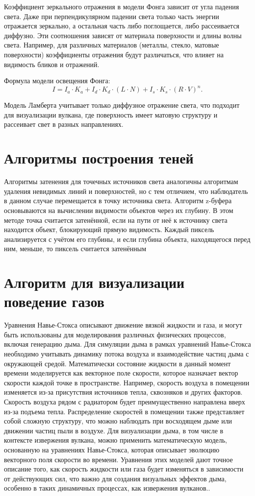 Коэффициент зеркального отражения в модели Фонга зависит от угла падения света. Даже при перпендикулярном падении света только часть энергии отражается зеркально, а остальная часть либо поглощается, либо рассеивается диффузно. Эти соотношения зависят от материала поверхности и длины волны света. Например, для различных материалов (металлы, стекло, матовые поверхности) коэффициенты отражения будут различаться, что влияет на видимость бликов и отражений.

Формула модели освещения Фонга:
$$
I = I_a \cdot K_a + I_d \cdot K_d \cdot (L \cdot N) + I_s \cdot K_s \cdot (R \cdot V)^n.
$$

Модель Ламберта учитывает только диффузное отражение света, что подходит для визуализации вулкана, где поверхность имеет матовую структуру и рассеивает свет в разных направлениях.

\section{Алгоритмы построения теней}
Алгоритмы затенения для точечных источников света аналогичны алгоритмам удаления невидимых линий и поверхностей, но с тем отличием, что наблюдатель в данном случае перемещается в точку источника света. Алгоритм z-буфера основываются на вычислении видимости объектов через их глубину. В этом методе точка считается затенённой, если на пути от неё к источнику света находится объект, блокирующий прямую видимость. Каждый пиксель анализируется с учётом его глубины, и если глубина объекта, находящегося перед ним, меньше, то пиксель считается затенённым

\section{Алгоритм для визуализации поведение газов}
Уравнения Навье-Стокса описывают движение вязкой жидкости и газа, и могут быть использованы для моделирования различных физических процессов, включая генерацию дыма. Для симуляции дыма в рамках уравнений Навье-Стокса необходимо учитывать динамику потока воздуха и взаимодействие частиц дыма с окружающей средой.
Математически состояние жидкости в данный момент времени моделируется как векторное поле скорости, которое назначает вектор скорости каждой точке в пространстве. Например, скорость воздуха в помещении изменяется из-за присутствия источников тепла, сквозняков и других факторов. Скорость воздуха рядом с радиатором будет преимущественно направлена вверх из-за подъема тепла. Распределение скоростей в помещении также представляет собой сложную структуру, что можно наблюдать при восходящем дыме или движении частиц пыли в воздухе. Для визуализации дыма, в том числе в контексте извержения вулкана, можно применить математическую модель, основанную на уравнениях Навье-Стокса, которая описывает эволюцию векторного поля скорости во времени. Уравнения этих моделей дают точное описание того, как скорость жидкости или газа будет изменяться в зависимости от действующих сил, что важно для создания визуальных эффектов дыма, особенно в таких динамичных процессах, как извержения вулканов..~\cite{lit3} 

